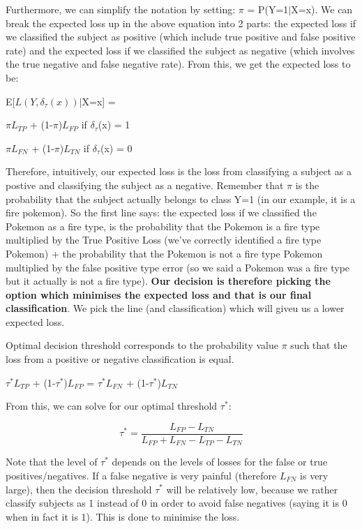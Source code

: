\documentclass[11pt, oneside]{article}
\theoremstyle{definition}
\begin{document}
Furthermore, we can simplify the notation by setting: $\pi$ = P(Y=1$|$X=x). We can break the expected loss up in the above equation into 2 parts: the expected loss if we classified the subject as positive (which include true positive and false positive rate) and the expected loss if we classified the subject as negative (which involves the true negative and false negative rate). From this, we get the expected loss to be:

\begin{center}
E[$L(Y,\delta_{\tau}(x))$$|$X=x] =

$\pi$$L_{TP}$ + (1-$\pi$)$L_{FP}$ if $\delta_{\tau}$(x) = 1

$\pi$$L_{FN}$ + (1-$\pi$)$L_{TN}$ if $\delta_{\tau}$(x) = 0
\end{center}

Therefore, intuitively, our expected loss is the loss from classifying a subject as a postive and classifying the subject as a negative. Remember that $\pi$ is the probability that the subject actually belongs to class Y=1 (in our example, it is a fire pokemon). So the first line says: the expected loss if we classified the Pokemon as a fire type, is the probability that the Pokemon is a fire type multiplied by the True Positive Loss (we've correctly identified a fire type Pokemon) + the probability that the Pokemon is not a fire type Pokemon multiplied by the false positive type error (so we said a Pokemon was a fire type but it actually is not a fire type).
\textbf{Our decision is therefore picking the option which minimises the expected loss and that is our final classification}. We pick the line (and classification) which will giveu us a lower expected loss.

Optimal decision threshold corresponds to the probability value $\pi$ such that the loss from a positive or negative classification is equal.

\begin{center}
$\tau^*$$L_{TP}$ + (1-$\tau^*$)$L_{FP}$ = $\tau^*$$L_{FN}$ + (1-$\tau^*$)$L_{TN}$
\end{center}

From this, we can solve for our optimal threshold $\tau^*$:

\begin{equation}
  \tau^* = \frac{L_{FP} - L_{TN}}{L_{FP} + L_{FN} - L_{TP} - L_{TN}}
\end{equation}

Note that the level of $\tau^*$ depends on the levels of losses for the false or true positives/negatives. If a false negative is very painful (therefore $L_{FN}$ is very large), then the decision threshold $\tau^*$ will be relatively low, because we rather classify subjects as 1 instead of 0 in order to avoid false negatives (saying it is 0 when in fact it is 1). This is done to minimise the loss.
\end{document}
